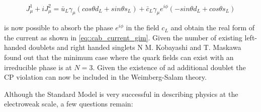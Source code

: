 \begin{equation}
J^{1}_{\mu} + i J^{2}_{\mu} =  \bar{u}_{L}\gamma_{\mu} \left(cos\theta d_{L} + sin\theta s_{L}\right) + \bar{c}_{L}\gamma_{\mu}e^{i\phi} (-sin\theta d_{L} + cos\theta s_{L})
\end{equation}

is now possible to absorb the phase $e^{i\phi}$ in the field $c_{L}$ and obtain the real form of the current as shown in \ref{eq::cab_current_gim}. Given the number of existing left-handed doublets and right handed singlets N M. Kobayashi and T. Maskawa found out that the minimum case where the quark fields can exist with an irreducible phase is at $N = 3$. Given the existence of ad additional doublet the CP violation can now be included in the Weimberg-Salam theory.




Although the Standard Model is very successful in describing physics at the electroweak scale, a few questions remain:

